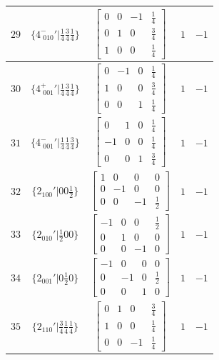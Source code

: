 \documentclass[fleqn,8pt]{jsarticle}
\begin{document}
\begin{longtable}{ccccc}
$ 29 $ & $ \{4^{-}_{\,\,010}{}'|\frac{1}{4} \frac{3}{4} \frac{1}{4}\} $ & $ \begin{bmatrix} 0 & 0 & -1 & \frac{1}{4} \\ 0 & 1 & 0 & \frac{3}{4} \\ 1 & 0 & 0 & \frac{1}{4} \end{bmatrix} $ & $ 1 $ & $ -1 $ \\ \hline
$ 30 $ & $ \{4^{+}_{\,\,001}{}'|\frac{1}{4} \frac{3}{4} \frac{1}{4}\} $ & $ \begin{bmatrix} 0 & -1 & 0 & \frac{1}{4} \\ 1 & 0 & 0 & \frac{3}{4} \\ 0 & 0 & 1 & \frac{1}{4} \end{bmatrix} $ & $ 1 $ & $ -1 $ \\ \hline
$ 31 $ & $ \{4^{-}_{\,\,001}{}'|\frac{1}{4} \frac{1}{4} \frac{3}{4}\} $ & $ \begin{bmatrix} 0 & 1 & 0 & \frac{1}{4} \\ -1 & 0 & 0 & \frac{1}{4} \\ 0 & 0 & 1 & \frac{3}{4} \end{bmatrix} $ & $ 1 $ & $ -1 $ \\ \hline
$ 32 $ & $ \{2{}_{100}{}'|0 0 \frac{1}{2}\} $ & $ \begin{bmatrix} 1 & 0 & 0 & 0 \\ 0 & -1 & 0 & 0 \\ 0 & 0 & -1 & \frac{1}{2} \end{bmatrix} $ & $ 1 $ & $ -1 $ \\ \hline
$ 33 $ & $ \{2{}_{010}{}'|\frac{1}{2} 0 0\} $ & $ \begin{bmatrix} -1 & 0 & 0 & \frac{1}{2} \\ 0 & 1 & 0 & 0 \\ 0 & 0 & -1 & 0 \end{bmatrix} $ & $ 1 $ & $ -1 $ \\ \hline
$ 34 $ & $ \{2{}_{001}{}'|0 \frac{1}{2} 0\} $ & $ \begin{bmatrix} -1 & 0 & 0 & 0 \\ 0 & -1 & 0 & \frac{1}{2} \\ 0 & 0 & 1 & 0 \end{bmatrix} $ & $ 1 $ & $ -1 $ \\ \hline
$ 35 $ & $ \{2{}_{110}{}'|\frac{3}{4} \frac{1}{4} \frac{1}{4}\} $ & $ \begin{bmatrix} 0 & 1 & 0 & \frac{3}{4} \\ 1 & 0 & 0 & \frac{1}{4} \\ 0 & 0 & -1 & \frac{1}{4} \end{bmatrix} $ & $ 1 $ & $ -1 $ \\ \hline

\end{longtable}
\end{document}
